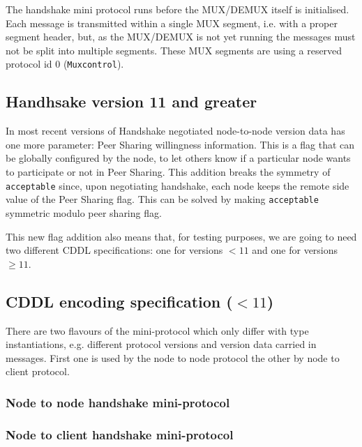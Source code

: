 The handshake mini protocol runs before the MUX/DEMUX itself is initialised.
Each message is transmitted within a single MUX segment, i.e. with a proper
segment header, but, as the MUX/DEMUX is not yet running the messages must not
be split into multiple segments.  These MUX segments are using a reserved
protocol id $0$ (\texttt{Muxcontrol}).

\subsection{Handhsake version 11 and greater}

In most recent versions of Handshake negotiated node-to-node version data has
one more parameter: Peer Sharing willingness information. This is a flag that
can be globally configured by the node, to let others know if a particular node
wants to participate or not in Peer Sharing. This addition breaks the symmetry
of \texttt{acceptable} since, upon negotiating handshake, each node keeps the
remote side value of the Peer Sharing flag. This can be solved by making
\texttt{acceptable} symmetric modulo peer sharing flag.

This new flag addition also means that, for testing purposes, we are going to
need two different CDDL specifications: one for versions $< 11$ and one for
versions $\geq 11$.

\subsection{CDDL encoding specification ($< 11$)}\label{handshake-cddl}
There are two flavours of the mini-protocol which only differ with type
instantiations, e.g. different protocol versions and version data carried in
messages.  First one is used by the node to node protocol the other by node to
client protocol.

\subsubsection{Node to node handshake mini-protocol}

\subsubsection{Node to client handshake mini-protocol}
\label{sec:nodetoclientcddl}


